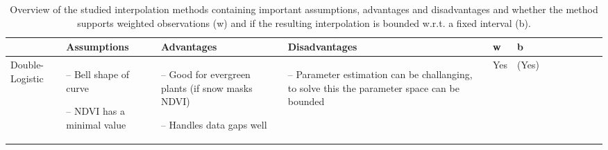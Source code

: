 \begin{table}[!ht]
	\centering
	\caption[Overview of the studied interpolation methods.]{Overview of the studied interpolation methods containing important assumptions, advantages and disadvantages and whether the method supports weighted observations (w) and if the resulting interpolation is bounded w.r.t. a fixed interval (b).}
	\small
	\begin{tabular}{p{1.6cm}p{3.3cm}p{3.3cm}p{3.4cm}p{0.4cm}p{0.4cm}p{3cm}p{3cm}p{3cm}p{3cm}p{2.7cm}p{3cm}|}
		\toprule
		~                                                                                                                                                            &
		\textbf{Assumptions}                                                                                                                                         &
		\textbf{Advantages}                                                                                                                                                &
		\textbf{Disadvantages}                                                                                                                                                &
		\textbf{w}                                                                                                                                      &
		\textbf{b}                                                                                                                                        \\ \hline

		Double-Logistic                                                                                                                                              &
		\begin{cptitemize} \item[--]  Bell shape of curve \item[--]  NDVI has a minimal value                       \end{cptitemize}        &
		\begin{cptitemize} \item[--]  Good for evergreen plants (if snow masks NDVI) \item[--] Handles data gaps well                            \end{cptitemize}        &
		\begin{cptitemize} \item[--]  Parameter estimation can be challanging, to solve this the parameter space can be bounded             \end{cptitemize}        &
		Yes                                                                                                                                                          &
		(Yes)                                                                                                                                                         \\ \hline%


\end{tabular}
\end{table}
